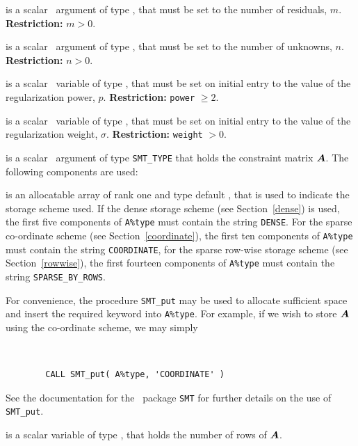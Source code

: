 \documentclass{galahad}
\begin{document}
\begin{description}

 is a scalar \intentin\ argument of type \integer, that must be
set to the number of residuals, $m$. {\bf Restriction: } $m  >  0$.

 is a scalar \intentin\ argument of type \integer, that must be
set to the number of unknowns, $n$. {\bf Restriction: } $n  >  0$.

 is a scalar \intentin\ variable of type \realdp,
that must be set on initial entry
to the value of the regularization power, $p$.
{\bf Restriction: } {\tt power} $\geq 2$.

 is a scalar \intentin\ variable of type \realdp,
that must be set on initial entry
to the value of the regularization weight, $\sigma$.
{\bf Restriction: } {\tt weight} $> 0$.

 is a scalar \intentin\ argument of type {\tt SMT\_TYPE}
that holds the constraint matrix ${\bm{A}}$. The following components are used:

\begin{description}

 is an allocatable array of rank one and type default
\character, that
is used to indicate the storage scheme used. If the dense storage scheme
(see Section~\ref{dense}) is used,
the first five components of {\tt A\%type} must contain the
string {\tt DENSE}.
For the sparse co-ordinate scheme (see Section~\ref{coordinate}),
the first ten components of {\tt A\%type} must contain the
string {\tt COORDINATE},
for the sparse row-wise storage scheme (see Section~\ref{rowwise}),
the first fourteen components of {\tt A\%type} must contain the
string {\tt SPARSE\_BY\_ROWS}.

For convenience, the procedure {\tt SMT\_put}
may be used to allocate sufficient space and insert the required keyword
into {\tt A\%type}.
For example, if we wish to store ${\bm{A}}$ using the co-ordinate scheme,
we may simply
{\tt
\begin{verbatim}
        CALL SMT_put( A%type, 'COORDINATE' )
\end{verbatim}
}
\noindent
See the documentation for the \galahad\ package {\tt SMT}
for further details on the use of {\tt SMT\_put}.

 is a scalar variable of type \integer, that
holds the number of rows of ${\bm{A}}$.


\end{description}
\end{description}
\end{document}
